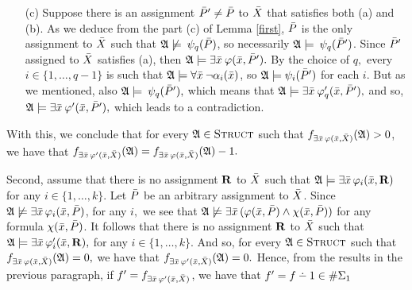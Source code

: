 \begin{enumerate}
\begin{enumerate}
		\item[(c)] Suppose there is an assignment $\P^\prime \neq \P$ to $\X$ that satisfies both (a) and (b). As we deduce from the part (c) of Lemma \ref{first}, $\P$ is the only assignment to $\X$ such that $\A\not\models\:\psi_q(\P)$, so necessarily $\A\models\:\psi_q(\P^\prime)$. Since $\P^\prime$ assigned to $\X$ satisfies (a), then $\A\models\exists\x\:\varphi(\x,\P^\prime).$ By the choice of $q,$ every $i\in\{1,\ldots,q-1\}$ is such that $\A\models\forall\x\:\neg\alpha_i(\x)$, so $\A\models\psi_i(\P^\prime)$ for each $i$. But as we mentioned, also $\A\models\:\psi_q(\P^\prime),$ which means that $\A\models\exists\x\:\varphi^\prime_q(\x,\P^\prime),$ and so, $\A\models\exists\x\:\varphi^\prime(\x,\P^\prime),$ which leads to a contradiction.
	\end{enumerate}
	
	With this, we conclude that for every $\A\in\str$ such that $f_{\exists\x\,\varphi(\x,\X)}(\A)>0$, we have that $f_{\exists\x\,\varphi^\prime(\x,\X)}(\A) = f_{\exists\x\,\varphi(\x,\X)}(\A)-1.$
	
	Second, assume that there is no assignment $\R$ to $\X$ such that $\A\models\exists\x\,\varphi_i(\x,\R)$ for any $i\in\{1,\ldots,k\}$. Let $\P$ be an arbitrary assignment to $\X$. Since $\A\not\models\exists\x\,\varphi_i(\x,\P)$, for any $i,$ we see that $\A\not\models\exists\x\,(\varphi(\x,\P)\wedge\chi(\x,\P))$ for any formula $\chi(\x,\P)$. It follows that there is no assignment $\R$ to $\X$ such that $\A\models\exists\x\,\varphi^\prime_i(\x,\R),$ for any $i\in\{1,\ldots,k\}$. And so, for every $\A\in\str$ such that $f_{\exists\x\,\varphi(\x,\X)}(\A)=0,$ we have that $f_{\exists\x\,\varphi^\prime(\x,\X)}(\A) = 0.$ Hence, from the results in the previous paragraph, if $f^\prime = f_{\exists\x\,\varphi^\prime(\x,\X)}$, we have that $f^\prime = f\dotminus 1\in\E{1}$ 
	

\end{enumerate}
